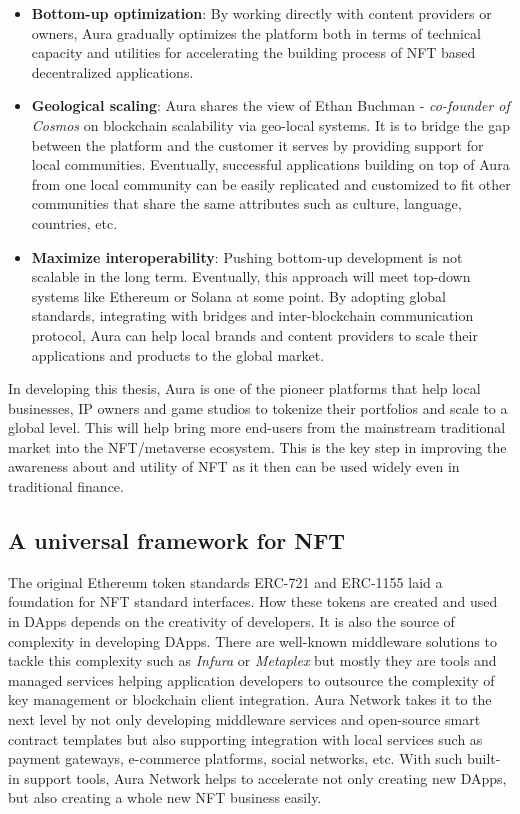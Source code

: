 \documentclass[11pt, titlepage]{article}
\begin{document}
\begin{itemize}
    \item \textbf{Bottom-up optimization}: By working directly with content providers or owners, Aura gradually optimizes the platform both in terms of technical capacity and utilities for accelerating the building process of NFT based decentralized applications. 
    \item \textbf{Geological scaling}: Aura shares the view of Ethan Buchman - \emph{co-founder of Cosmos} on blockchain scalability via geo-local systems. It is to bridge the gap between the platform and the customer it serves by providing support for local communities. Eventually, successful applications building on top of Aura from one local community can be easily replicated and customized to fit other communities that share the same attributes such as culture, language, countries, etc.
    
    \item \textbf{Maximize interoperability}: Pushing bottom-up development is not scalable in the long term. Eventually, this approach will meet top-down systems like Ethereum or Solana at some point. By adopting global standards, integrating with bridges and inter-blockchain communication protocol, Aura can help local brands and content providers to scale their applications and products to the global market.
\end{itemize}

In developing this thesis, Aura is one of the pioneer platforms that help local businesses, IP owners and game studios to tokenize their portfolios and scale to a global level. This will help bring more end-users from the mainstream traditional market into the NFT/metaverse ecosystem. This is the key step in improving the awareness about and utility of NFT as it then can be used widely even in traditional finance.  

\subsection{A universal framework for NFT}
The original Ethereum token standards ERC-721 and ERC-1155 laid a foundation for NFT standard interfaces. How these tokens are created and used in DApps depends on the creativity of developers. It is also the source of complexity in developing DApps. There are well-known middleware solutions to tackle this complexity such as \emph{Infura} or \emph{Metaplex} but mostly they are tools and managed services helping application developers to outsource the complexity of key management or blockchain client integration. Aura Network takes it to the next level by not only developing middleware services and open-source smart contract templates but also supporting integration with local services such as payment gateways, e-commerce platforms, social networks, etc. With such built-in support tools, Aura Network helps to accelerate not only creating new DApps, but also creating a whole new NFT business easily. 
\end{document}
